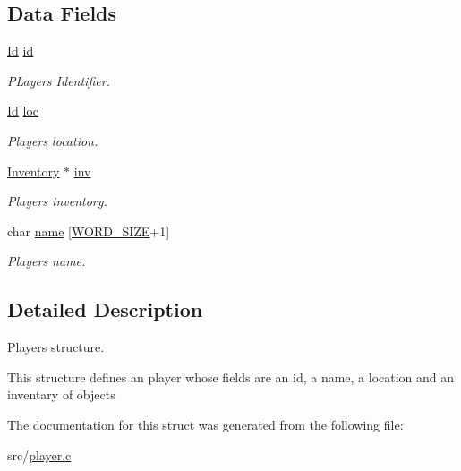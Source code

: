 \subsection*{Data Fields}
\begin{DoxyCompactItemize}
\item 
\mbox{\label{struct__Player_a60d635cd063816a9c1bd873f4868bb90}} 
\hyperlink{types_8h_a845e604fb28f7e3d97549da3448149d3}{Id} \hyperlink{struct__Player_a60d635cd063816a9c1bd873f4868bb90}{id}
\begin{DoxyCompactList}\small\item\em P\+Layer\textquotesingle{}s Identifier. \end{DoxyCompactList}\item 
\mbox{\label{struct__Player_a40f39335ccf0d2de882b7588f1917e58}} 
\hyperlink{types_8h_a845e604fb28f7e3d97549da3448149d3}{Id} \hyperlink{struct__Player_a40f39335ccf0d2de882b7588f1917e58}{loc}
\begin{DoxyCompactList}\small\item\em Player\textquotesingle{}s location. \end{DoxyCompactList}\item 
\mbox{\label{struct__Player_aaaeeb03326c37ce62c333c2b94fde23c}} 
\hyperlink{struct__Inventory}{Inventory} $\ast$ \hyperlink{struct__Player_aaaeeb03326c37ce62c333c2b94fde23c}{inv}
\begin{DoxyCompactList}\small\item\em Player\textquotesingle{}s inventory. \end{DoxyCompactList}\item 
\mbox{\label{struct__Player_ac89715f913cc607b75eb7236765c41f5}} 
char \hyperlink{struct__Player_ac89715f913cc607b75eb7236765c41f5}{name} \mbox{[}\hyperlink{types_8h_a92ed8507d1cd2331ad09275c5c4c1c89}{W\+O\+R\+D\+\_\+\+S\+I\+ZE}+1\mbox{]}
\begin{DoxyCompactList}\small\item\em Player\textquotesingle{}s name. \end{DoxyCompactList}\end{DoxyCompactItemize}


\subsection{Detailed Description}
Player\textquotesingle{}s structure. 

This structure defines an player whose fields are an id, a name, a location and an inventary of objects 

The documentation for this struct was generated from the following file\+:\begin{DoxyCompactItemize}
\item 
src/\hyperlink{player_8c}{player.\+c}\end{DoxyCompactItemize}
